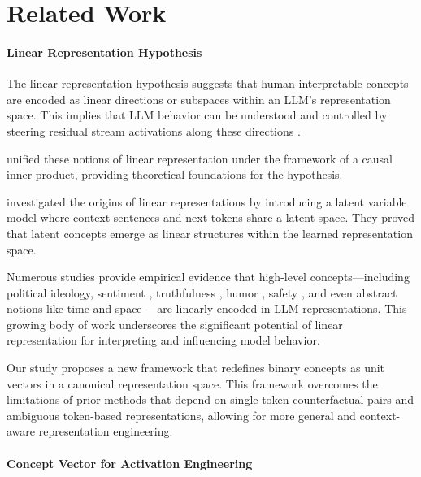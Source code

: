 \section{Related Work}
\paragraph{Linear Representation Hypothesis}
The linear representation hypothesis suggests that human-interpretable concepts are encoded as linear directions or subspaces within an LLM’s representation space. This implies that LLM behavior can be understood and controlled by steering residual stream activations along these directions \citep{singhrepresentation, zou2023transparency}.


\citet{park2024the} unified these notions of linear representation under the framework of a causal inner product, providing theoretical foundations for the hypothesis. 

\citet{jiangorigins} investigated the origins of linear representations by introducing a latent variable model where context sentences and next tokens share a latent space. They proved that latent concepts emerge as linear structures within the learned representation space. %

Numerous studies provide empirical evidence that high-level concepts—including political ideology, sentiment \citep{tigges2023linear, hollinsworth2024language}, truthfulness \citep{zou2023transparency, li2024inference, marks2023geometry}, humor \citep{vonlanguage}, safety \citep{arditi2024refusal}, and even abstract notions like time and space \citep{gurnee2023language}—are linearly encoded in LLM representations. This growing body of work underscores the significant potential of linear representation for interpreting and influencing model behavior. 

Our study proposes a new framework that redefines binary concepts as unit vectors in a canonical representation space. This framework overcomes the limitations of prior methods that depend on single-token counterfactual pairs and ambiguous token-based representations, allowing for more general and context-aware representation engineering.

\paragraph{Concept Vector for Activation Engineering}
\label{subsec:steering_activation_engineering}


